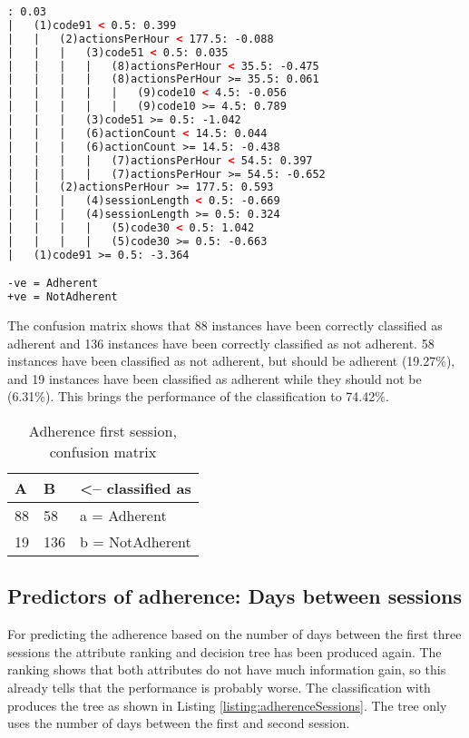 \begin{lstlisting}[caption={Adherence first session, ADTree decision tree}, label=listing:adherenceFirstTree, float=htpb, language=xml]
: 0.03
|	(1)code91 < 0.5: 0.399
|	|	(2)actionsPerHour < 177.5: -0.088
|	|	|	(3)code51 < 0.5: 0.035
|	|	|	|	(8)actionsPerHour < 35.5: -0.475
|	|	|	|	(8)actionsPerHour >= 35.5: 0.061
|	|	|	|	|	(9)code10 < 4.5: -0.056
|	|	|	|	|	(9)code10 >= 4.5: 0.789
|	|	|	(3)code51 >= 0.5: -1.042
|	|	|	(6)actionCount < 14.5: 0.044
|	|	|	(6)actionCount >= 14.5: -0.438
|	|	|	|	(7)actionsPerHour < 54.5: 0.397
|	|	|	|	(7)actionsPerHour >= 54.5: -0.652
|	|	(2)actionsPerHour >= 177.5: 0.593
|	|	|	(4)sessionLength < 0.5: -0.669
|	|	|	(4)sessionLength >= 0.5: 0.324
|	|	|	|	(5)code30 < 0.5: 1.042
|	|	|	|	(5)code30 >= 0.5: -0.663
|	(1)code91 >= 0.5: -3.364

-ve = Adherent
+ve = NotAdherent
\end{lstlisting}

The confusion matrix shows that 88 instances have been correctly classified as adherent and 136 instances have been correctly classified as not adherent. 58 instances have been classified as not adherent, but should be adherent (19.27\%), and 19 instances have been classified as adherent while they should not be (6.31\%). This brings the performance of the classification to 74.42\%.

\begin{table}[]
	\centering
	\caption{Adherence first session, \\confusion matrix}
	\label{table:adherenceFirstMatrix}
	\begin{tabular}{@{}ll|l@{}}
		\toprule
		\textbf{A} & \textbf{B} & \textless-- classified as \\ \midrule
		88         & 58         & a = Adherent              \\
		19         & 136        & b = NotAdherent           \\ \bottomrule
	\end{tabular}
\end{table}

\newpage
\subsection{Predictors of adherence: Days between sessions}
For predicting the adherence based on the number of days between the first three sessions the attribute ranking and decision tree has been produced again. The ranking shows that both attributes do not have much information gain, so this already tells that the performance is probably worse. The classification with  produces the tree as shown in Listing \ref{listing:adherenceSessions}. The tree only uses the number of days between the first and second session.

